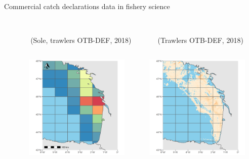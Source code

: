 \documentclass[
  10pt,
  ignorenonframetext,
]{beamer}
\begin{document}
\begin{frame}{Commercial catch declarations data in fishery science}
\protect\hypertarget{commercial-catch-declarations-data-in-fishery-science}{}

\begin{columns}
\begin{column}{0.1\textwidth}
\end{column}
\begin{column}{0.45\textwidth}
 \\
\scriptsize (Sole, trawlers OTB-DEF, 2018) 
\end{column}
\begin{column}{0.45\textwidth}
 \\
\scriptsize (Trawlers OTB-DEF, 2018)
\end{column}
\end{columns}

\begin{columns}
\begin{column}{0.1\textwidth}
\end{column}
\begin{column}{0.45\textwidth}
\includegraphics[width=5cm]{images/logbooks_data.png}
\end{column}
\begin{column}{0.45\textwidth}
\includegraphics[width=5cm]{images/vms_data.png}
\end{column}
\end{columns}


\end{frame}
\end{document}
